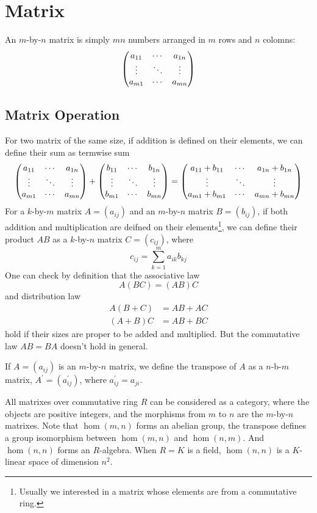 \section{Matrix}
An $m$-by-$n$ matrix is simply $mn$ numbers arranged in $m$ rows and $n$ colomns:
$$\left(\begin{matrix}
a_{11} & \cdots & a_{1n} \cr
\vdots & \ddots & \vdots \cr
a_{m1} & \cdots & a_{mn}
\end{matrix}\right)$$

\subsection{Matrix Operation}
For two matrix of the same size, if addition is defined on their elements,
we can define their sum as termwise sum
$$\left(\begin{matrix}
a_{11} & \cdots & a_{1n} \cr
\vdots & \ddots & \vdots \cr
a_{m1} & \cdots & a_{mn}
\end{matrix}\right) +
\left(\begin{matrix}
b_{11} & \cdots & b_{1n} \cr
\vdots & \ddots & \vdots \cr
b_{m1} & \cdots & b_{mn}
\end{matrix}\right)
=\left(\begin{matrix}
a_{11} + b_{11} & \cdots & a_{1n} + b_{1n} \cr
\vdots & \ddots & \vdots \cr
a_{m1} + b_{m1} & \cdots & a_{mn} + b_{mn}
\end{matrix}\right)$$
For a $k$-by-$m$ matrix $A = (a_{ij})$ and an $m$-by-$n$ matrix $B = (b_{ij})$,
if both addition and multiplication are deifned on their elements\footnote{
Usually we interested in a matrix whose elements are from a commutative ring.},
we can define their product $AB$ as a $k$-by-$n$ matrix $C = (c_{ij})$, where
$$c_{ij} = \sum_{k=1}^m a_{ik}b_{kj}$$
One can check by definition that the associative law $$A(BC) = (AB)C$$
and distribution law
\begin{align*}
A(B + C) &= AB + AC \\
(A + B)C &= AB + BC
\end{align*}
hold if their sizes are proper to be added and multiplied.
But the commutative law $AB = BA$ doesn't hold in general.

If $A = (a_{ij})$ is an $m$-by-$n$ matrix,
we define the transpose of $A$ as a $n$-b-$m$ matrix,
$A^\prime = (a^\prime_{ij})$, where $a^\prime_{ij} = a_{ji}$.

\begin{rem}
All matrixes over commutative ring $R$ can be considered as a category,
where the objects are positive integers, and the morphisms from $m$ to $n$ are
the $m$-by-$n$ matrixes. Note that $\hom(m, n)$ forms an abelian group, the
transpose defines a group isomorphism between $\hom(m, n)$ and $\hom(n, m)$.
And $\hom(n, n)$ forms an $R$-algebra. When $R = K$ is a field, $\hom(n, n)$
is a $K$-linear space of dimension $n^2$.
\end{rem}

